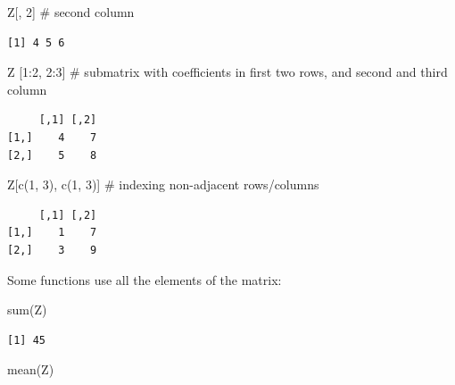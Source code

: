 \documentclass[
  letterpaper,
  DIV=11,
  numbers=noendperiod]{scrreprt}
\newenvironment{Shaded}{\begin{snugshade}}{\end{snugshade}}
\newcommand{\CommentTok}[1]{\textcolor[rgb]{0.37,0.37,0.37}{#1}}
\newcommand{\DecValTok}[1]{\textcolor[rgb]{0.68,0.00,0.00}{#1}}
\newcommand{\FunctionTok}[1]{\textcolor[rgb]{0.28,0.35,0.67}{#1}}
\newcommand{\NormalTok}[1]{\textcolor[rgb]{0.00,0.23,0.31}{#1}}
\newcommand{\SpecialCharTok}[1]{\textcolor[rgb]{0.37,0.37,0.37}{#1}}
\begin{document}
\begin{Shaded}
\begin{Highlighting}[]
\NormalTok{Z[, }\DecValTok{2}\NormalTok{] }\CommentTok{\# second column}
\end{Highlighting}
\end{Shaded}

\begin{verbatim}
[1] 4 5 6
\end{verbatim}

\begin{Shaded}
\begin{Highlighting}[]
\NormalTok{Z [}\DecValTok{1}\SpecialCharTok{:}\DecValTok{2}\NormalTok{, }\DecValTok{2}\SpecialCharTok{:}\DecValTok{3}\NormalTok{] }\CommentTok{\# submatrix with coefficients in first two rows, and second and third column}
\end{Highlighting}
\end{Shaded}

\begin{verbatim}
     [,1] [,2]
[1,]    4    7
[2,]    5    8
\end{verbatim}

\begin{Shaded}
\begin{Highlighting}[]
\NormalTok{Z[}\FunctionTok{c}\NormalTok{(}\DecValTok{1}\NormalTok{, }\DecValTok{3}\NormalTok{), }\FunctionTok{c}\NormalTok{(}\DecValTok{1}\NormalTok{, }\DecValTok{3}\NormalTok{)] }\CommentTok{\# indexing non{-}adjacent rows/columns}
\end{Highlighting}
\end{Shaded}

\begin{verbatim}
     [,1] [,2]
[1,]    1    7
[2,]    3    9
\end{verbatim}

Some functions use all the elements of the matrix:

\begin{Shaded}
\begin{Highlighting}[]
\FunctionTok{sum}\NormalTok{(Z)}
\end{Highlighting}
\end{Shaded}

\begin{verbatim}
[1] 45
\end{verbatim}

\begin{Shaded}
\begin{Highlighting}[]
\FunctionTok{mean}\NormalTok{(Z)}
\end{Highlighting}
\end{Shaded}
\end{document}

